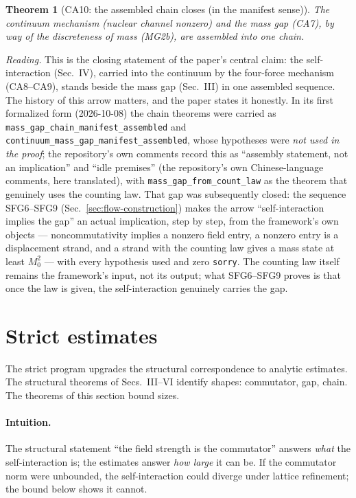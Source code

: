 \documentclass[aps,prd,preprint,superscriptaddress,amsmath,amssymb]{revtex4-2}
\newtheorem{theorem}{Theorem}[section]
\begin{document}
\begin{theorem}[CA10: the assembled chain closes (in the manifest sense)]
\label{thm:ca10}
The continuum mechanism (nuclear channel nonzero) and the mass gap
(CA7), by way of the discreteness of mass (MG2b), are assembled into
one chain.
\end{theorem}

\emph{Reading.}  This is the closing statement of the paper's
central claim: the self-interaction (Sec.~IV), carried into the
continuum by the four-force mechanism (CA8--CA9), stands beside the
mass gap (Sec.~III) in one assembled sequence.  The history of this
arrow matters, and the paper states it honestly.  In its first
formalized form (2026-10-08) the chain theorems were carried as
\texttt{mass\_gap\_chain\_manifest\_assembled} and
\texttt{continuum\_mass\_gap\_manifest\_assembled}, whose hypotheses
were \emph{not used in the proof}; the repository's own comments
record this as ``assembly statement, not an implication'' and
``idle premises'' (the repository's own Chinese-language comments,
here translated), with
\texttt{mass\_gap\_from\_count\_law} as the theorem that genuinely
uses the counting law.  That gap was subsequently closed: the
sequence SFG6--SFG9 (Sec.~\ref{sec:flow-construction}) makes the
arrow ``self-interaction implies the gap'' an actual implication,
step by step, from the framework's own objects --- noncommutativity
implies a nonzero field entry, a nonzero entry is a
displacement strand, and a strand with the counting law gives a mass
state at least $M_0^2$ --- with every hypothesis used and zero
\texttt{sorry}.  The counting law itself remains the framework's
input, not its output; what SFG6--SFG9 proves is that once the law
is given, the self-interaction genuinely carries the gap.

\section{Strict estimates}
\label{sec:strict}

The strict program upgrades the structural correspondence to
analytic estimates.  The structural theorems of Secs.~III--VI
identify shapes: commutator, gap, chain.  The theorems of this
section bound sizes.

\paragraph{Intuition.}  The structural statement ``the field strength
is the commutator'' answers \emph{what} the self-interaction is; the
estimates answer \emph{how large} it can be.  If the commutator norm
were unbounded, the self-interaction could diverge under lattice
refinement; the bound below shows it cannot.
\end{document}
